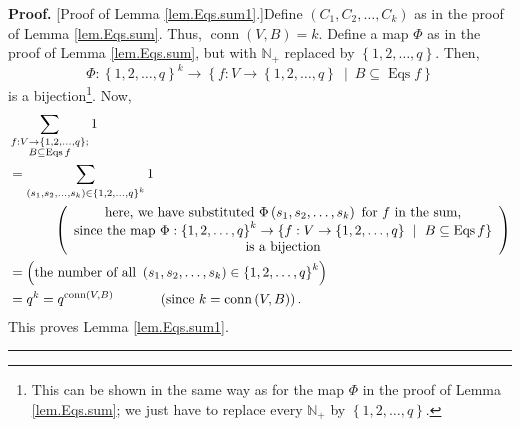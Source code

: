 \documentclass[numbers=enddot,12pt,final,onecolumn,notitlepage]{scrartcl}%
\theoremstyle{definition}
\newenvironment{proof}[1][Proof]{\noindent\textbf{#1.} }{\ \rule{0.5em}{0.5em}}
\newenvironment{vershort}{}{}
\let\sumnonlimits\sum
\renewcommand{\sum}{\sumnonlimits\limits}
\begin{document}
\begin{vershort}
\begin{proof}
[Proof of Lemma \ref{lem.Eqs.sum1}.]Define $\left(  C_{1},C_{2},\ldots
,C_{k}\right)  $ as in the proof of Lemma \ref{lem.Eqs.sum}. Thus,
$\operatorname*{conn}\left(  V,B\right)  =k$. Define a map $\Phi$ as in the
proof of Lemma \ref{lem.Eqs.sum}, but with $\mathbb{N}_{+}$ replaced by
$\left\{  1,2,\ldots,q\right\}  $. Then,
\[
\Phi:\left\{  1,2,\ldots,q\right\}  ^{k}\rightarrow\left\{  f:V\rightarrow
\left\{  1,2,\ldots,q\right\}  \ \mid\ B\subseteq\operatorname*{Eqs}f\right\}
\]
is a bijection\footnote{This can be shown in the same way as for the map
$\Phi$ in the proof of Lemma \ref{lem.Eqs.sum}; we just have to replace every
$\mathbb{N}_{+}$ by $\left\{  1,2,\ldots,q\right\}  $.}. Now,%
\begin{align*}
&  \sum_{\substack{f:V\rightarrow\left\{  1,2,\ldots,q\right\}  ;\\B\subseteq
\operatorname*{Eqs}f}}1\\
&  =\sum_{\left(  s_{1},s_{2},\ldots,s_{k}\right)  \in\left\{  1,2,\ldots
,q\right\}  ^{k}}1\\
&  \ \ \ \ \ \ \ \ \ \ \left(
\begin{array}
[c]{c}%
\text{here, we have substituted }\Phi\left(  s_{1},s_{2},\ldots,s_{k}\right)
\text{ for }f\text{ in the sum,}\\
\text{since the map }\Phi:\left\{  1,2,\ldots,q\right\}  ^{k}\rightarrow
\left\{  f:V\rightarrow\left\{  1,2,\ldots,q\right\}  \ \mid\ B\subseteq
\operatorname*{Eqs}f\right\} \\
\text{is a bijection}%
\end{array}
\right) \\
&  =\left(  \text{the number of all }\left(  s_{1},s_{2},\ldots,s_{k}\right)
\in\left\{  1,2,\ldots,q\right\}  ^{k}\right) \\
&  =q^{k}=q^{\operatorname*{conn}\left(  V,B\right)  }%
\ \ \ \ \ \ \ \ \ \ \left(  \text{since }k=\operatorname*{conn}\left(
V,B\right)  \right)  .
\end{align*}
This proves Lemma \ref{lem.Eqs.sum1}.
\end{proof}
\end{vershort}
\end{document}
